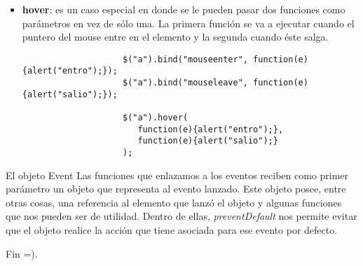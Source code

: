 \documentclass[10pt]{beamer}
\begin{document}
\begin{frame}[fragile]
	\begin{itemize}
		\pause \item \textbf{hover}: es un caso especial en donde se le pueden pasar dos funciones
			como parámetros en vez de sólo una. La primera función se va a ejecutar cuando el puntero
			del mouse entre en el elemento y la segunda cuando éste salga.
		\pause \begin{lstlisting}
					$("a").bind("mouseenter", function(e){alert("entro");});
					$("a").bind("mouseleave", function(e){alert("salio");});
					
					$("a").hover(
					   function(e){alert("entro");},
					   function(e){alert("salio");}
					);
				\end{lstlisting}
	\end{itemize}
	
	\pause \begin{block}{El objeto Event}
		Las funciones que enlazamos a los eventos reciben como primer parámetro un objeto que representa al evento
		lanzado. Este objeto posee, entre otras cosas, una referencia al elemento que lanzó el objeto y algunas funciones
		que nos pueden ser de utilidad. Dentro de ellas, \emph{preventDefault} nos permite evitar que el objeto realice
		la acción que tiene asociada para ese evento por defecto.
	\end{block}
\end{frame}

\begin{frame}
	\begin{center}
		Fin =).
	\end{center}
\end{frame}
\end{document}
